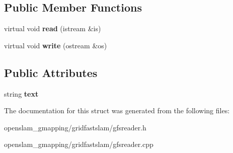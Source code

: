 \subsection*{Public Member Functions}
\begin{DoxyCompactItemize}
\item 
\mbox{\label{structGMapping_1_1GFSReader_1_1CommentRecord_aac4f0ea6e4ffc1c8b0e1efc72d9a1f47}} 
virtual void {\bfseries read} (istream \&is)
\item 
\mbox{\label{structGMapping_1_1GFSReader_1_1CommentRecord_a78e4cbb1522d3f594c9d9c22ac974d04}} 
virtual void {\bfseries write} (ostream \&os)
\end{DoxyCompactItemize}
\subsection*{Public Attributes}
\begin{DoxyCompactItemize}
\item 
\mbox{\label{structGMapping_1_1GFSReader_1_1CommentRecord_a4e8c70f303618d640f2a18c8fe02729d}} 
string {\bfseries text}
\end{DoxyCompactItemize}


The documentation for this struct was generated from the following files\+:\begin{DoxyCompactItemize}
\item 
openslam\+\_\+gmapping/gridfastslam/gfsreader.\+h\item 
openslam\+\_\+gmapping/gridfastslam/gfsreader.\+cpp\end{DoxyCompactItemize}
